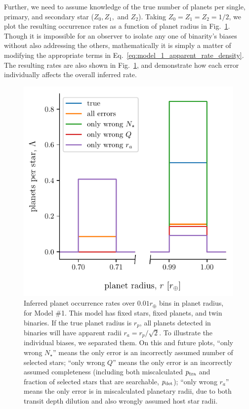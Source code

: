 Further, we need to assume knowledge of the true number of planets per 
single, primary, and secondary star ($Z_0,Z_1,$ and $Z_2$).
Taking $Z_0=Z_1=Z_2=1/2$, we plot the resulting occurrence rates as a function 
of planet radius in Fig.~\ref{fig:errcases_model_1}.
Though it is impossible for an observer to isolate any one of binarity's 
biases without also addressing the others, mathematically it is simply a 
matter of modifying the appropriate terms in 
Eq.~\ref{eq:model_1_apparent_rate_density}.
The resulting rates are also shown in 
Fig.~\ref{fig:errcases_model_1}, and demonstrate how each 
error individually affects the overall inferred rate.

\begin{figure}[!tb]
    \begin{center}
        \includegraphics[width=.6\textwidth]{figures/errcases_rate_density_vs_radius_model_1_brokenx.pdf}
    \end{center}
    \vspace{-0.5cm}
    \caption{
        Inferred planet occurrence rates over $0.01r_\oplus$ bins in planet 
        radius,
        for Model \#1.
        This model has fixed stars, fixed planets, and twin binaries.
        If the true planet radius is $r_p$, all planets 
        detected in binaries will have apparent radii $r_a = r_p/\sqrt{2}$.
        To illustrate the individual biases, we 
        separated them.
        On this and future plots,
        ``only wrong $N_\star$'' means the only error is an incorrectly 
        assumed 
        number of selected stars;
        ``only wrong $Q$'' means the only error is an incorrectly assumed 
        completeness (including both miscalculated $p_{\rm tra}$ 
        and fraction of selected stars that are searchable, $p_{\rm det}$);
        ``only wrong $r_a$'' means the only error is in miscalculated        
        planetary radii, due to both transit depth dilution and also wrongly 
        assumed host star radii.
    }
    \label{fig:errcases_model_1}
\end{figure}


